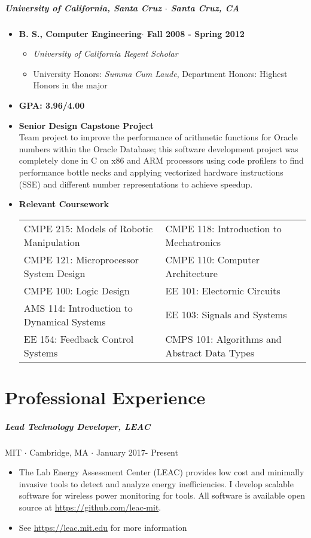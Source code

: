 \documentclass[10pt,letterpaper]{article}
\begin{document}
\subparagraph{University of California, Santa Cruz $\cdot$ Santa Cruz, CA }
\begin{itemize}
\item {\bf B. S., Computer Engineering$\cdot$ Fall 2008 - Spring 2012}
\begin{itemize}
		\item {\em University of California Regent Scholar} 
		\item University Honors: {\em Summa Cum Laude}, Department Honors: Highest Honors in the major

	\end{itemize}
    	\item {\bf GPA: 3.96/4.00 }
        \item {\bf Senior Design Capstone Project}\\
    Team project to improve the performance of arithmetic functions for Oracle numbers within the Oracle Database; this software development project was completely done in C on x86 and ARM processors using code profilers to find performance bottle necks and applying vectorized hardware instructions (SSE) and different number representations to achieve speedup. 
    	\item {\bf Relevant Coursework}\\
    \begin{tabularx}{\textwidth}{l l}
    CMPE 215: Models of Robotic Manipulation & \hfill CMPE 118: Introduction to Mechatronics \\
    CMPE 121: Microprocessor System Design & \hfill CMPE 110: Computer Architecture \\
    CMPE 100: Logic Design & \hfill EE 101: Electornic Circuits \\
     AMS 114: Introduction to Dynamical Systems & \hfill EE 103: Signals and Systems \\
    EE 154: Feedback Control Systems & \hfill CMPS 101: Algorithms and Abstract Data Types\\
        \end{tabularx}
\end{itemize}



\section*{Professional Experience}
\subparagraph{Lead Technology Developer, LEAC} MIT $\cdot$ Cambridge, MA $\cdot$ January 2017- Present
\begin{itemize}
    \item The Lab Energy Assessment Center (LEAC) provides low cost and minimally invasive tools to detect and analyze energy inefficiencies. I develop scalable software for wireless power monitoring for tools. All software is available open source at \url{https://github.com/leac-mit}.
\item See \url{https://leac.mit.edu} for more information
\end{itemize}
\end{document}
